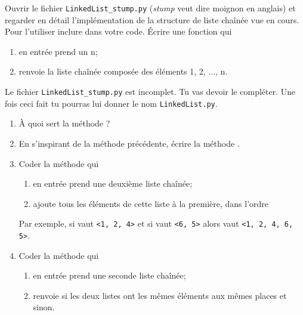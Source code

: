 \documentclass[a4paper,12pt,french]{article}
\begin{document}

\begin{exercice}
Ouvrir le fichier \texttt{LinkedList\_stump.py} (\textit{stump} veut dire moignon en anglais) et regarder en détail l'implémentation de la structure de liste chaînée vue en cours.\\
Pour l'utiliser inclure  dans votre code.
    \'Ecrire une fonction  qui
    \begin{enumerate}[--]
        \item en entrée prend un  n;
        \item renvoie la liste chaînée composée des éléments 1, 2, ..., n.
    \end{enumerate}
\end{exercice}
\begin{exercice}
Le fichier \texttt{LinkedList\_stump.py}  est incomplet. Tu vas devoir le compléter. Une fois ceci fait tu pourras lui donner le nom \texttt{LinkedList.py}.
\begin{enumerate}[\bfseries 1.]
    \item À quoi sert la méthode  ?
    \item En s'inspirant de la méthode précédente, écrire la méthode .
    \item Coder la méthode  qui
          \begin{enumerate}[--]
              \item en entrée prend une deuxième liste chaînée;
              \item ajoute tous les éléments de cette liste à la première, dans l'ordre
          \end{enumerate}
            Par exemple, si  vaut \texttt{<1, 2, 4>} et si  vaut \texttt{<6, 5>} alors  vaut \texttt{<1, 2, 4, 6, 5>}.
     \item Coder la méthode  qui
     \begin{enumerate}[--]
         \item en entrée prend une seconde liste chaînée;
         \item renvoie  si les deux listes ont les mêmes éléments aux mêmes places et  sinon.
     \end{enumerate}
\end{enumerate}
\end{exercice}
\end{document}
